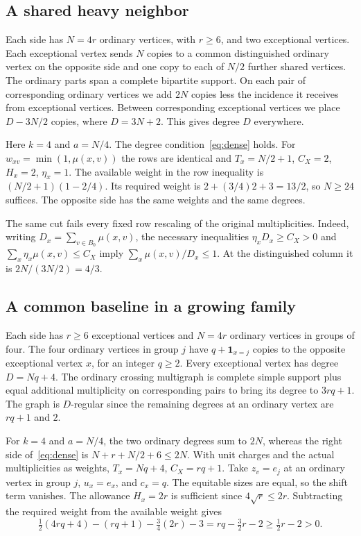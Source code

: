 \documentclass[11pt]{article}
\begin{document}
\subsection{A shared heavy neighbor}

Each side has \(N=4r\) ordinary vertices, with \(r\ge6\), and two exceptional vertices. Each exceptional vertex sends \(N\) copies to a common distinguished ordinary vertex on the opposite side and one copy to each of \(N/2\) further shared vertices. The ordinary parts span a complete bipartite support. On each pair of corresponding ordinary vertices we add \(2N\) copies less the incidence it receives from exceptional vertices. Between corresponding exceptional vertices we place \(D-3N/2\) copies, where \(D=3N+2\). This gives degree \(D\) everywhere.

Here \(k=4\) and \(a=N/4\). The degree condition~\eqref{eq:dense} holds. For \(w_{xv}=\min(1,\mu(x,v))\) the rows are identical and \(T_x=N/2+1\), \(C_X=2\), \(H_x=2\), \(\eta_x=1\). The available weight in the row inequality is \((N/2+1)(1-2/4)\). Its required weight is \(2+(3/4)2+3=13/2\), so \(N\ge24\) suffices. The opposite side has the same weights and the same degrees.

The same cut fails every fixed row rescaling of the original multiplicities. Indeed, writing \(D_x=\sum_{v\in B_0}\mu(x,v)\), the necessary inequalities \(\eta_xD_x\ge C_X>0\) and \(\sum_x\eta_x\mu(x,v)\le C_X\) imply \(\sum_x\mu(x,v)/D_x\le1\). At the distinguished column it is \(2N/(3N/2)=4/3\).

\subsection{A common baseline in a growing family}

Each side has \(r\ge6\) exceptional vertices and \(N=4r\) ordinary vertices in groups of four. The four ordinary vertices in group \(j\) have \(q+\mathbf1_{x=j}\) copies to the opposite exceptional vertex \(x\), for an integer \(q\ge2\). Every exceptional vertex has degree \(D=Nq+4\). The ordinary crossing multigraph is complete simple support plus equal additional multiplicity on corresponding pairs to bring its degree to \(3rq+1\). The graph is \(D\)-regular since the remaining degrees at an ordinary vertex are \(rq+1\) and \(2\).

For \(k=4\) and \(a=N/4\), the two ordinary degrees sum to \(2N\), whereas the right side of~\eqref{eq:dense} is \(N+r+N/2+6\le2N\). With unit charges and the actual multiplicities as weights, \(T_x=Nq+4\), \(C_X=rq+1\). Take \(z_v=e_j\) at an ordinary vertex in group \(j\), \(u_x=e_x\), and \(c_x=q\). The equitable sizes are equal, so the shift term vanishes. The allowance \(H_x=2r\) is sufficient since \(4\sqrt r\le2r\). Subtracting the required weight from the available weight gives
\[
 \tfrac12(4rq+4)-(rq+1)-\tfrac34(2r)-3
 =rq-\tfrac32r-2\ge \tfrac12r-2>0 .
\]
\end{document}
